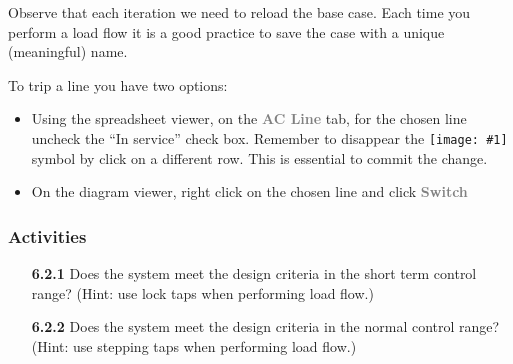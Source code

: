 \documentclass[paper=a4, fontsize=11pt]{article}
\newcommand{\mychar}[1]{%
  \begingroup\normalfont
  \texttt{[image: \#1]}%
  \endgroup
}
\begin{document}
Observe that each iteration we need to reload the base case. Each time you perform a load flow it is a good practice to save the case with a unique (meaningful) name.

To trip a line you have two options:
\begin{itemize}
\item{Using the spreadsheet viewer, on the \textbf{\textcolor{gray}{AC Line}} tab, for the chosen line uncheck the ``In service'' check box. Remember to disappear the \mychar{pencil.png} symbol by click on a different row. This is essential to commit the change.}
\item{On the diagram viewer, right click on the chosen line and click \textbf{\textcolor{gray}{Switch}}}
\end{itemize}

\subsubsection*{Activities}
\begin{enumerate}
\item[\textbf{6.2.1}] Does the system meet the design criteria in the short term control range? (Hint: use lock taps when performing load flow.)
\item[\textbf{6.2.2}] Does the system meet the design criteria in the normal control range? (Hint: use stepping taps when performing load flow.)
\end{enumerate}
\end{document}
